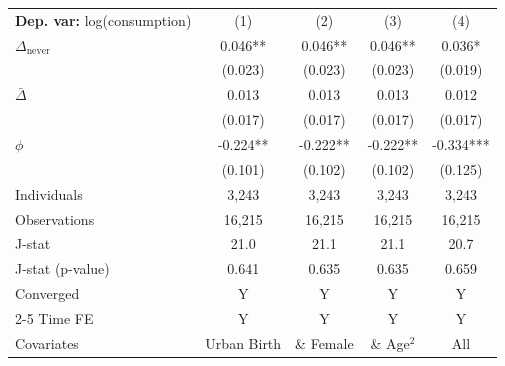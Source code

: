 \begin{tabular}{l cccc} \toprule  \textbf{Dep. var:}  log(consumption) 
                    &\multicolumn{1}{c}{(1)}   &\multicolumn{1}{c}{(2)}   &\multicolumn{1}{c}{(3)}   &\multicolumn{1}{c}{(4)}   \\

\addlinespace
$\Delta_{\text{never}}$&       0.046** &       0.046** &       0.046** &       0.036*  \\
                    &     (0.023)   &     (0.023)   &     (0.023)   &     (0.019)   \\

\addlinespace
$\bar{\Delta}$      &       0.013   &       0.013   &       0.013   &       0.012   \\
                    &     (0.017)   &     (0.017)   &     (0.017)   &     (0.017)   \\

\addlinespace
$\phi$              &      -0.224** &      -0.222** &      -0.222** &      -0.334***\\
                    &     (0.101)   &     (0.102)   &     (0.102)   &     (0.125)   \\
\addlinespace
Individuals         &       3,243   &       3,243   &       3,243   &       3,243   \\
Observations        &      16,215   &      16,215   &      16,215   &      16,215   \\
J-stat              &        21.0   &        21.1   &        21.1   &        20.7   \\
J-stat (p-value)    &       0.641   &       0.635   &       0.635   &       0.659   \\
Converged           &           Y   &           Y   &           Y   &           Y   \\
\cmidrule{2-5} Time FE & Y & Y & Y & Y \\ Covariates & Urban Birth & \& Female & \& Age$^2$ & All \\ \bottomrule \end{tabular}
